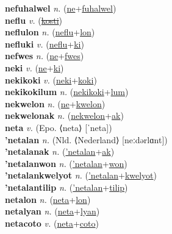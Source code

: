 \textbf{nefuhalwel} \textit{n.} (\hyperref[ne]{ne}+\hyperref[fuhalwel]{fuhalwel})
 \label{nefuhalwel} \\
\textbf{neflu} \textit{v.} (\hyperref[kosti]{\sout{kosti}})
 \label{neflu} \\
\textbf{neflulon} \textit{n.} (\hyperref[neflu]{neflu}+\hyperref[lon]{lon})
 \label{neflulon} \\
\textbf{nefluki} \textit{v.} (\hyperref[neflu]{neflu}+\hyperref[ki]{ki})
 \label{nefluki} \\
\textbf{nefwes} \textit{n.} (\hyperref[ne]{ne}+\hyperref[fwes]{fwes})
 \label{nefwes} \\
\textbf{neki} \textit{v.} (\hyperref[ne]{ne}+\hyperref[ki]{ki})
 \label{neki} \\
\textbf{nekikoki} \textit{v.} (\hyperref[neki]{neki}+\hyperref[koki]{koki})
 \label{nekikoki} \\
\textbf{nekikokilum} \textit{n.} (\hyperref[nekikoki]{nekikoki}+\hyperref[lum]{lum})
 \label{nekikokilum} \\
\textbf{nekwelon} \textit{n.} (\hyperref[ne]{ne}+\hyperref[kwelon]{kwelon})
 \label{nekwelon} \\
\textbf{nekwelonak} \textit{n.} (\hyperref[nekwelon]{nekwelon}+\hyperref[ak]{ak})
 \label{nekwelonak} \\
\textbf{neta} \textit{v.} (Epo. ⟨neta⟩ [ˈneta])
 \label{neta} \\
\textbf{'netalan} \textit{n.} (Nld. ⟨Nederland⟩ [neːdərlɑnt])
 \label{'netalan} \\
\textbf{'netalanak} \textit{n.} (\hyperref['netalan]{'netalan}+\hyperref[ak]{ak})
 \label{'netalanak} \\
\textbf{'netalanwon} \textit{n.} (\hyperref['netalan]{'netalan}+\hyperref[won]{won})
 \label{'netalanwon} \\
\textbf{'netalankwelyot} \textit{n.} (\hyperref['netalan]{'netalan}+\hyperref[kwelyot]{kwelyot})
 \label{'netalankwelyot} \\
\textbf{'netalantilip} \textit{n.} (\hyperref['netalan]{'netalan}+\hyperref[tilip]{tilip})
 \label{'netalantilip} \\
\textbf{netalon} \textit{n.} (\hyperref[neta]{neta}+\hyperref[lon]{lon})
 \label{netalon} \\
\textbf{netalyan} \textit{n.} (\hyperref[neta]{neta}+\hyperref[lyan]{lyan})
 \label{netalyan} \\
\textbf{netacoto} \textit{v.} (\hyperref[neta]{neta}+\hyperref[coto]{coto})
 \label{netacoto} \\
